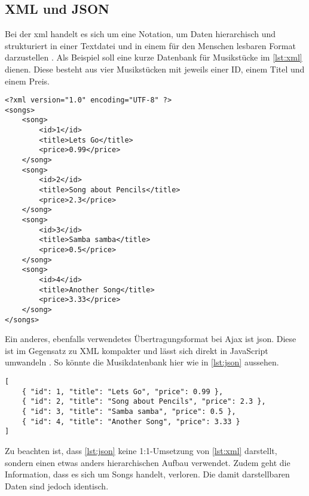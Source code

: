 \subsection{XML und JSON}
Bei der \ac{xml} handelt es sich um eine Notation, um Daten hierarchisch und strukturiert in einer Textdatei und in einem für den Menschen lesbaren Format darzustellen \cite[S. 34]{seb10}. Als Beispiel soll eine kurze Datenbank für Musikstücke im \autoref{lst:xml} dienen. Diese besteht aus vier Musikstücken mit jeweils einer ID, einem Titel und einem Preis.
\begin{lstlisting}[style=xml, caption=Ein XML-Beispiel, label=lst:xml]
<?xml version="1.0" encoding="UTF-8" ?>
<songs>
	<song>
		<id>1</id>
		<title>Lets Go</title>
		<price>0.99</price>
	</song>
	<song>
		<id>2</id>
		<title>Song about Pencils</title>
		<price>2.3</price>
	</song>
	<song>
		<id>3</id>
		<title>Samba samba</title>
		<price>0.5</price>
	</song>
	<song>
		<id>4</id>
		<title>Another Song</title>
		<price>3.33</price>
	</song>
</songs>
\end{lstlisting}

Ein anderes, ebenfalls verwendetes Übertragungsformat bei Ajax ist \ac{json}. Diese ist im Gegensatz zu XML kompakter und lässt sich direkt in JavaScript umwandeln \cite[S. 658]{rie09}. So könnte die Musikdatenbank hier wie in \autoref{lst:json} aussehen.

\begin{lstlisting}[style=htmlcssjs, caption=JSON für eine einfache Musikdatenbank, label=lst:json]
[
	{ "id": 1, "title": "Lets Go", "price": 0.99 },
	{ "id": 2, "title": "Song about Pencils", "price": 2.3 },
	{ "id": 3, "title": "Samba samba", "price": 0.5 },
	{ "id": 4, "title": "Another Song", "price": 3.33 }
]
\end{lstlisting}

Zu beachten ist, dass \autoref{lst:json} keine 1:1-Umsetzung von \autoref{lst:xml} darstellt, sondern einen etwas anders hierarchischen Aufbau verwendet. Zudem geht die Information, dass es sich um Songs handelt, verloren. Die damit darstellbaren Daten sind jedoch identisch.